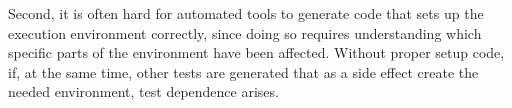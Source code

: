 

Second, it is often hard for automated tools to
generate code that sets up the execution environment correctly,
since doing so requires understanding which specific parts
of the environment have been affected.
Without proper setup code, if, at the same time, 
other tests are generated that as a side effect
create the needed environment, test dependence arises.








